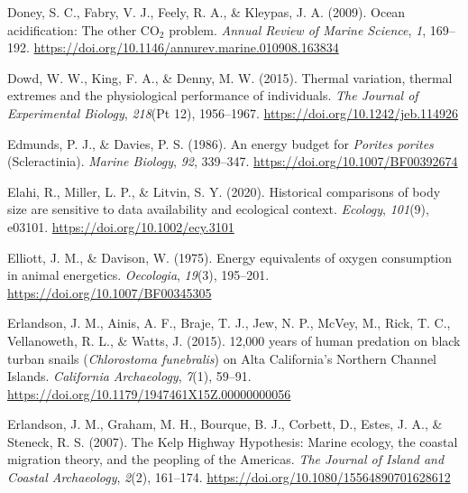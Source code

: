 \documentclass{CSUNthesis}
\begin{document}
\vspace{0.1em}

Doney, S. C., Fabry, V. J., Feely, R. A., \& Kleypas, J. A. (2009). Ocean acidification: The other CO\(_2\) problem. \textit{Annual Review of Marine Science}, \textit{1}, 169--192. \url{https://doi.org/10.1146/annurev.marine.010908.163834}

\vspace{0.1em}

Dowd, W. W., King, F. A., \& Denny, M. W. (2015). Thermal variation, thermal extremes and the physiological performance of individuals. \textit{The Journal of Experimental Biology}, \textit{218}(Pt 12), 1956--1967. \url{https://doi.org/10.1242/jeb.114926}

\vspace{0.1em}

Edmunds, P. J., \& Davies, P. S. (1986). An energy budget for \textit{Porites porites} (Scleractinia). \textit{Marine Biology}, \textit{92}, 339--347. \url{https://doi.org/10.1007/BF00392674}

\vspace{0.1em}

Elahi, R., Miller, L. P., \& Litvin, S. Y. (2020). Historical comparisons of body size are sensitive to data availability and ecological context. \textit{Ecology}, \textit{101}(9), e03101. \url{https://doi.org/10.1002/ecy.3101}

\vspace{0.1em}

Elliott, J. M., \& Davison, W. (1975). Energy equivalents of oxygen consumption in animal energetics. \textit{Oecologia}, \textit{19}(3), 195--201. \url{https://doi.org/10.1007/BF00345305}

\vspace{0.1em}

Erlandson, J. M., Ainis, A. F., Braje, T. J., Jew, N. P., McVey, M., Rick, T. C., Vellanoweth, R. L., \& Watts, J. (2015). 12,000 years of human predation on black turban snails (\textit{Chlorostoma funebralis}) on Alta California's Northern Channel Islands. \textit{California Archaeology}, \textit{7}(1), 59--91. \url{https://doi.org/10.1179/1947461X15Z.00000000056}

\vspace{0.1em}

Erlandson, J. M., Graham, M. H., Bourque, B. J., Corbett, D., Estes, J. A., \& Steneck, R. S. (2007). The Kelp Highway Hypothesis: Marine ecology, the coastal migration theory, and the peopling of the Americas. \textit{The Journal of Island and Coastal Archaeology}, \textit{2}(2), 161--174. \url{https://doi.org/10.1080/15564890701628612}
\end{document}
